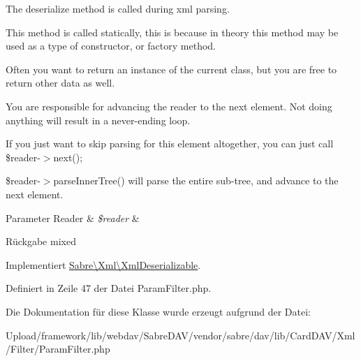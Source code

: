 The deserialize method is called during xml parsing.

This method is called statically, this is because in theory this method may be used as a type of constructor, or factory method.

Often you want to return an instance of the current class, but you are free to return other data as well.

You are responsible for advancing the reader to the next element. Not doing anything will result in a never-\/ending loop.

If you just want to skip parsing for this element altogether, you can just call \$reader-\/$>$next();

\$reader-\/$>$parse\+Inner\+Tree() will parse the entire sub-\/tree, and advance to the next element.


\begin{DoxyParams}[1]{Parameter}
Reader & {\em \$reader} & \\
\hline
\end{DoxyParams}
\begin{DoxyReturn}{Rückgabe}
mixed 
\end{DoxyReturn}


Implementiert \mbox{\hyperlink{interface_sabre_1_1_xml_1_1_xml_deserializable_a19e0eca545b9a0d93f7d6b69085ade30}{Sabre\textbackslash{}\+Xml\textbackslash{}\+Xml\+Deserializable}}.



Definiert in Zeile 47 der Datei Param\+Filter.\+php.



Die Dokumentation für diese Klasse wurde erzeugt aufgrund der Datei\+:\begin{DoxyCompactItemize}
\item 
Upload/framework/lib/webdav/\+Sabre\+D\+A\+V/vendor/sabre/dav/lib/\+Card\+D\+A\+V/\+Xml/\+Filter/Param\+Filter.\+php\end{DoxyCompactItemize}
